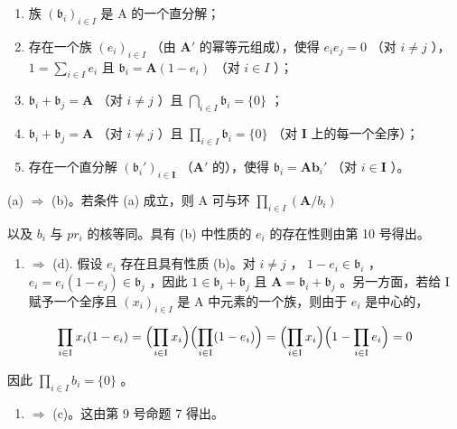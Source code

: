 \begin{enumerate}
\def\labelenumi{(\alph{enumi})}
\item
  族 \((\mathfrak{b}_i)_{i\in I}\) 是 A 的一个直分解；
\item
  存在一个族 \((e_i)_{i\in I}\) （由 \(\mathbf{A}'\) 的幂等元组成），使得 \(e_i e_j = 0\) （对 \(i\neq j\) ）， \(1 = \sum_{i\in I}e_i\) 且 \(\mathfrak{b}_i = \mathbf{A}(1 - e_i)\) （对 \(i\in I\) ）；
\item
  \(\mathfrak{b}_i + \mathfrak{b}_j = \mathbf{A}\) （对 \(i \neq j\) ）且 \(\bigcap_{i \in I} \mathfrak{b}_i = \{0\}\) ；
\item
  \(\mathfrak{b}_i + \mathfrak{b}_j = \mathbf{A}\) （对 \(i \neq j\) ）且 \(\prod_{i \in I} \mathfrak{b}_i = \{0\}\) （对 \(\mathbf{I}\) 上的每一个全序）；
\item
  存在一个直分解 \((\mathfrak{b}_i')_{i\in \mathbf{I}}\) （\(\mathbf{A}'\) 的），使得 \(\mathfrak{b}_i = \mathbf{Ab}_i'\) （对 \(i\in \mathbf{I}\) ）。
\end{enumerate}

(a) \(\Rightarrow\) (b)。若条件 (a) 成立，则 A 可与环 \(\prod_{i\in I}(\mathbf{A} / b_i)\)

以及 \(b_{i}\) 与 \(pr_{i}\) 的核等同。具有 (b) 中性质的 \(e_{i}\) 的存在性则由第 10 号得出。

\begin{enumerate}
\def\labelenumi{(\alph{enumi})}
\setcounter{enumi}{1}
\tightlist
\item
  \(\Rightarrow\) (d). 假设 \(e_i\) 存在且具有性质 (b)。对 \(i \neq j\) ， \(1 - e_i \in \mathfrak{b}_i\) ， \(e_i = e_i(1 - e_j) \in \mathfrak{b}_j\) ，因此 \(1 \in \mathfrak{b}_i + \mathfrak{b}_j\) 且 \(\mathbf{A} = \mathfrak{b}_i + \mathfrak{b}_j\) 。另一方面，若给 I 赋予一个全序且 \((x_i)_{i \in I}\) 是 A 中元素的一个族，则由于 \(e_i\) 是中心的，
\end{enumerate}

\[
\prod_ {i \in \mathrm{I}} x _ {i} (1 - e _ {i}) = \Bigl (\prod_ {i \in \mathrm{I}} x _ {i} \Bigr) \Bigl (\prod_ {i \in \mathrm{I}} (1 - e _ {i}) \Bigr) = \Bigl (\prod_ {i \in \mathrm{I}} x _ {i} \Bigr) \Bigl (1 - \prod_ {i \in \mathrm{I}} e _ {i} \Bigr) = 0
\]

因此 \(\prod_{i\in I}b_i = \{0\}\) 。

\begin{enumerate}
\def\labelenumi{(\alph{enumi})}
\setcounter{enumi}{3}
\item
  \(\Rightarrow\) (c)。这由第 9 号命题 7 得出。
\end{enumerate}

